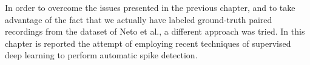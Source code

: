 
In order to overcome the issues presented in the previous chapter, and to take advantage of the fact that we actually have labeled ground-truth paired recordings from the dataset of Neto et al., a different approach was tried. In this chapter is reported the attempt of employing recent techniques of supervised deep learning to perform automatic spike detection.

